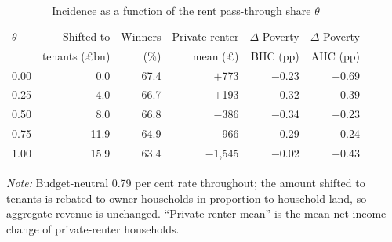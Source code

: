 \begin{table}[htbp]
\centering
\caption{Incidence as a function of the rent pass-through share $\theta$}
\label{tab:passthrough}
\begin{tabular}{lrrrrr}
\toprule
$\theta$ & Shifted to & Winners & Private renter & $\Delta$ Poverty & $\Delta$ Poverty \\
 & tenants (\pounds bn) & (\%) & mean (\pounds) & BHC (pp) & AHC (pp) \\
\midrule
0.00 & 0.0  & 67.4 & $+$773     & $-$0.23 & $-$0.69 \\
0.25 & 4.0  & 66.7 & $+$193     & $-$0.32 & $-$0.39 \\
0.50 & 8.0  & 66.8 & $-$386     & $-$0.34 & $-$0.23 \\
0.75 & 11.9 & 64.9 & $-$966     & $-$0.29 & $+$0.24 \\
1.00 & 15.9 & 63.4 & $-$1{,}545 & $-$0.02 & $+$0.43 \\
\bottomrule
\end{tabular}

\medskip
{\footnotesize\emph{Note:} Budget-neutral 0.79 per cent rate throughout; the amount shifted to tenants is rebated to owner households in proportion to household land, so aggregate revenue is unchanged. ``Private renter mean'' is the mean net income change of private-renter households.}
\end{table}

